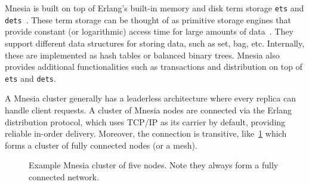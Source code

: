 Mnesia is built on top of Erlang's built-in memory and disk term storage
\texttt{ets} and \texttt{dets}~\cite{ericssonab2023stdlib}.  These term storage
can be thought of as primitive storage engines that provide constant (or
logarithmic) access time for large amounts of data~\cite{hebert2013LYSE}.
They support different data structures for storing data, such as set, 
bag, etc.  Internally, these are implemented as hash tables or balanced binary trees.
Mnesia also provides additional functionalities such as transactions and 
distribution on top of \texttt{ets} and \texttt{dets}.

A Mnesia cluster generally has a leaderless architecture where every replica can 
handle client requests. A cluster of Mnesia nodes are connected via the
Erlang distribution protocol, which uses TCP/IP as its carrier by default, providing
reliable in-order delivery. Moreover, the connection is transitive, 
like~\cref{fig:example mnesia cluster} which forms a cluster of fully connected
nodes (or a mesh).


\begin{figure}[htp]
  \caption{Example Mnesia cluster of five nodes. Note they always form a
  fully connected network.}
  \label{fig:example mnesia cluster}
\end{figure}



